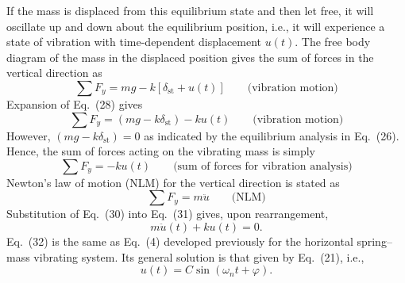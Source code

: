 If the mass is displaced from this equilibrium state and then let free, it will oscillate up and down about the equilibrium position, i.e., it will experience a state of vibration with time-dependent displacement $u(t)$. The free body diagram of the mass in the displaced position gives the sum of forces in the vertical direction as
\begin{equation}
    \sum F_y=mg-k\left[\delta_{\mathrm{st}}+u(t)\right] \qquad\text{(vibration motion)} \tag{28}
\end{equation}
Expansion of Eq.~(28) gives
\begin{equation}
    \sum F_y=(mg-k\delta_{\mathrm{st}})-ku(t) \qquad\text{(vibration motion)} \tag{29}
\end{equation}
However, $(mg-k\delta_{\mathrm{st}})=0$ as indicated by the equilibrium analysis in Eq.~(26). Hence, the sum of forces acting on the vibrating mass is simply
\begin{equation}
    \sum F_y=-ku(t) \qquad\text{(sum of forces for vibration analysis)} \tag{30}
\end{equation}
Newton's law of motion (NLM) for the vertical direction is stated as
\begin{equation}
    \sum F_y=m\ddot{u} \qquad\text{(NLM)} \tag{31}
\end{equation}
Substitution of Eq.~(30) into Eq.~(31) gives, upon rearrangement,
\begin{equation}
    m\ddot{u}(t)+ku(t)=0. \tag{32}
\end{equation}
Eq.~(32) is the same as Eq.~(4) developed previously for the horizontal spring--mass vibrating system. Its general solution is that given by Eq.~(21), i.e.,
\begin{equation}
    u(t)=C\sin(\omega_n t+\varphi). \tag{21}
\end{equation}
